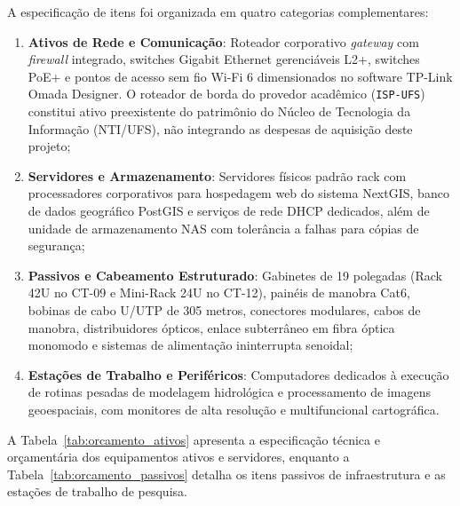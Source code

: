 A especificação de itens foi organizada em quatro categorias complementares:
\begin{enumerate}
    \item \textbf{Ativos de Rede e Comunicação}: Roteador corporativo \textit{gateway} com \textit{firewall} integrado, switches Gigabit Ethernet gerenciáveis L2+, switches PoE+ e pontos de acesso sem fio Wi-Fi 6 dimensionados no software TP-Link Omada Designer. O roteador de borda do provedor acadêmico (\texttt{ISP-UFS}) constitui ativo preexistente do patrimônio do Núcleo de Tecnologia da Informação (NTI/UFS), não integrando as despesas de aquisição deste projeto;
    \item \textbf{Servidores e Armazenamento}: Servidores físicos padrão rack com processadores corporativos para hospedagem web do sistema NextGIS, banco de dados geográfico PostGIS e serviços de rede DHCP dedicados, além de unidade de armazenamento NAS com tolerância a falhas para cópias de segurança;
    \item \textbf{Passivos e Cabeamento Estruturado}: Gabinetes de 19 polegadas (Rack 42U no CT-09 e Mini-Rack 24U no CT-12), painéis de manobra Cat6, bobinas de cabo U/UTP de 305 metros, conectores modulares, cabos de manobra, distribuidores ópticos, enlace subterrâneo em fibra óptica monomodo e sistemas de alimentação ininterrupta senoidal;
    \item \textbf{Estações de Trabalho e Periféricos}: Computadores dedicados à execução de rotinas pesadas de modelagem hidrológica e processamento de imagens geoespaciais, com monitores de alta resolução e multifuncional cartográfica.
\end{enumerate}

A Tabela~\ref{tab:orcamento_ativos} apresenta a especificação técnica e orçamentária dos equipamentos ativos e servidores, enquanto a Tabela~\ref{tab:orcamento_passivos} detalha os itens passivos de infraestrutura e as estações de trabalho de pesquisa.

